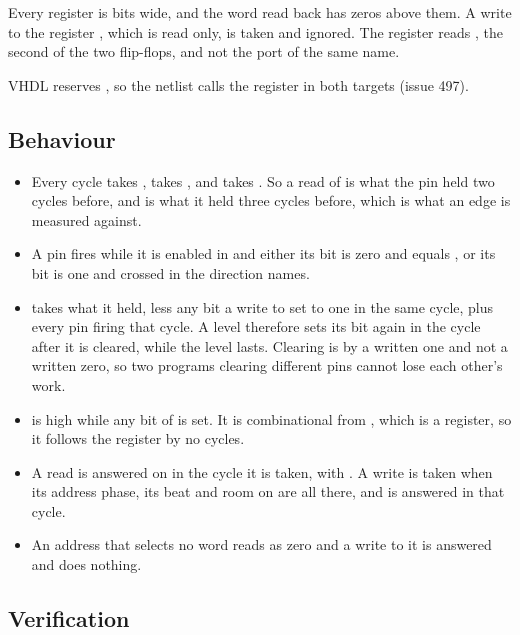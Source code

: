 
Every register is  bits wide, and the word read back has zeros
above them. A write to the register , which is read only, is taken
and ignored. The register reads , the second of the two
flip-flops, and not the port of the same name.

VHDL reserves , so the netlist calls the register
 in both targets (issue 497).


\subsection*{Behaviour}

\begin{itemize}
\item Every cycle  takes ,  takes
, and  takes . So a read of
 is what the pin held two cycles before, and 
is what it held three cycles before, which is what an edge is measured
against.
\item A pin fires while it is enabled in  and either its
 bit is zero and  equals , or its
 bit is one and  crossed  in the
direction  names.
\item {} takes what it held, less any bit a write to
 set to one in the same cycle, plus every pin firing that
cycle. A level therefore sets its bit again in the cycle after it is
cleared, while the level lasts. Clearing is by a written one and not a
written zero, so two programs clearing different pins cannot lose each
other's work.
\item {} is high while any bit of  is set. It is
combinational from , which is a register, so it follows
the register by no cycles.
\item A read is answered on  in the cycle it is taken, with
. A write is taken when its address phase, its beat and
room on  are all there, and is answered  in that
cycle.
\item An address that selects no word reads as zero and a write to it
is answered and does nothing.
\end{itemize}

\subsection*{Verification}

